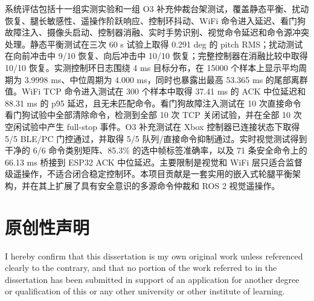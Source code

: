 \documentclass[12pt, a4paper]{article}
\begin{document}
系统评估包括十一组实测实验和一组 O3 补充仲裁台架测试，覆盖静态平衡、扰动恢复、腿长敏感性、遥操作阶跃响应、控制环抖动、WiFi 命令进入延迟、看门狗故障注入、摄像头启动、控制器消融、实时手势识别、视觉命令延迟和命令源冲突处理。静态平衡测试在三次 60 s 试验上取得 0.291 deg 的 pitch RMS；扰动测试在向前冲击中 9/10 恢复、向后冲击中 10/10 恢复；完整控制器在消融比较中取得 10/10 恢复。实测控制环日志围绕 4 ms 目标分布，在 15000 个样本上显示平均周期为 3.9998 ms、中位周期为 4.000 ms，同时也暴露出最高 53.365 ms 的尾部离群值。WiFi TCP 命令进入测试在 300 个样本中取得 37.41 ms 的 ACK 中位延迟和 88.31 ms 的 p95 延迟，且无未匹配命令。看门狗故障注入测试在 10 次直接命令看门狗试验中全部清除命令，检测到全部 10 次 TCP 关闭试验，并在全部 10 次空闲试验中产生 full-stop 事件。O3 补充测试在 Xbox 控制器已连接状态下取得 5/5 BLE/PC 门控通过，并取得 5/5 队列/直接命令抑制通过。实时视觉测试得到干净的 6/6 命令类别矩阵、85.3\% 的选中帧标签准确率，以及 71 条安全命令上的 66.13 ms 桥接到 ESP32 ACK 中位延迟。主要限制是视觉和 WiFi 层只适合监督级遥操作，不适合闭合稳定控制环。本项目贡献是一套实用的嵌入式轮腿平衡架构，并在其上扩展了具有安全意识的多源命令仲裁和 ROS 2 视觉遥操作。

\newpage
\section*{原创性声明}
I hereby confirm that this dissertation is my own original work unless referenced clearly to the contrary, and that no portion of the work referred to in the dissertation has been submitted in support of an application for another degree or qualification of this or any other university or other institute of learning.

\newpage
\end{document}
